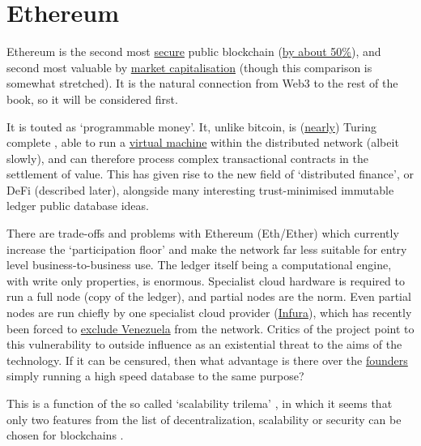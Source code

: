 \section{Ethereum}
Ethereum \cite{buterin2013ethereum} is the second most \href{https://www.crypto51.app/}{secure} public blockchain (\href{https://howmanyconfs.com/}{by about 50\%})\cite{sayeed2019assessing}, and second most valuable by \href{https://coinmarketcap.com/}{market capitalisation} (though this comparison is somewhat stretched). It is the natural connection from Web3 to the rest of the book, so it will be considered first.\par
It is touted as `programmable money'. It, unlike bitcoin, is (\href{https://hackernoon.com/turing-completeness-and-the-ethereum-blockchain-c5a93b865c1a}{nearly}) Turing complete \cite{petzold2008annotated}, able to run a \href{https://ethereum.org/en/developers/docs/evm/}{virtual machine} within the distributed network (albeit slowly), and can therefore process complex transactional contracts in the settlement of value. This has given rise to the new field of `distributed finance', or DeFi (described later), alongside many interesting trust-minimised immutable ledger public database ideas. \par
There are trade-offs and problems with Ethereum (Eth/Ether) which currently increase the `participation floor' and make the network far less suitable for entry level business-to-business use. The ledger itself being a computational engine, with write only properties, is enormous. Specialist cloud hardware is required to run a full node (copy of the ledger), and partial nodes are the norm. Even partial nodes are run chiefly by one specialist cloud provider (\href{https://consensys.net/blog/news/why-infura-is-the-secret-weapon-of-ethereum-infrastructure/}{Infura}), which has recently been forced to \href{https://finance.yahoo.com/news/metamask-infura-block-certain-areas-173749914.html}{exclude Venezuela} from the network. Critics of the project point to this vulnerability to outside influence as an existential threat to the aims of the technology. If it can be censured, then what advantage is there over the \href{https://protos.com/consensys-lawsuit-jpmorgan-owns-critical-ethereum-infrastructure/}{founders} simply running a high speed database to the same purpose? \par
This is a function of the so called `scalability trilema' \cite{hafid2020scaling}, in which it seems that only two features from the list of decentralization, scalability or security can be chosen for blockchains \cite{bonneau2015sok}.\par
